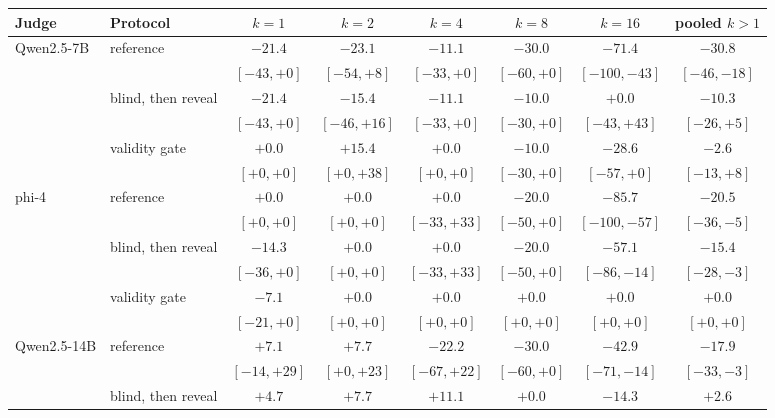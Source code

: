 \begin{tabular}{llcccccc}
\toprule
Judge & Protocol & $k{=}1$ & $k{=}2$ & $k{=}4$ & $k{=}8$ & $k{=}16$ & pooled $k{>}1$ \\
\midrule
Qwen2.5-7B & reference & $-21.4$ & $-23.1$ & $-11.1$ & $-30.0$ & $-71.4$ & $-30.8$ \\
 & & {\scriptsize$[-43,+0]$} & {\scriptsize$[-54,+8]$} & {\scriptsize$[-33,+0]$} & {\scriptsize$[-60,+0]$} & {\scriptsize$[-100,-43]$} & {\scriptsize$[-46,-18]$} \\
 & blind, then reveal & $-21.4$ & $-15.4$ & $-11.1$ & $-10.0$ & $+0.0$ & $-10.3$ \\
 & & {\scriptsize$[-43,+0]$} & {\scriptsize$[-46,+16]$} & {\scriptsize$[-33,+0]$} & {\scriptsize$[-30,+0]$} & {\scriptsize$[-43,+43]$} & {\scriptsize$[-26,+5]$} \\
 & validity gate & $+0.0$ & $+15.4$ & $+0.0$ & $-10.0$ & $-28.6$ & $-2.6$ \\
 & & {\scriptsize$[+0,+0]$} & {\scriptsize$[+0,+38]$} & {\scriptsize$[+0,+0]$} & {\scriptsize$[-30,+0]$} & {\scriptsize$[-57,+0]$} & {\scriptsize$[-13,+8]$} \\
\addlinespace
phi-4 & reference & $+0.0$ & $+0.0$ & $+0.0$ & $-20.0$ & $-85.7$ & $-20.5$ \\
 & & {\scriptsize$[+0,+0]$} & {\scriptsize$[+0,+0]$} & {\scriptsize$[-33,+33]$} & {\scriptsize$[-50,+0]$} & {\scriptsize$[-100,-57]$} & {\scriptsize$[-36,-5]$} \\
 & blind, then reveal & $-14.3$ & $+0.0$ & $+0.0$ & $-20.0$ & $-57.1$ & $-15.4$ \\
 & & {\scriptsize$[-36,+0]$} & {\scriptsize$[+0,+0]$} & {\scriptsize$[-33,+33]$} & {\scriptsize$[-50,+0]$} & {\scriptsize$[-86,-14]$} & {\scriptsize$[-28,-3]$} \\
 & validity gate & $-7.1$ & $+0.0$ & $+0.0$ & $+0.0$ & $+0.0$ & $+0.0$ \\
 & & {\scriptsize$[-21,+0]$} & {\scriptsize$[+0,+0]$} & {\scriptsize$[+0,+0]$} & {\scriptsize$[+0,+0]$} & {\scriptsize$[+0,+0]$} & {\scriptsize$[+0,+0]$} \\
\addlinespace
Qwen2.5-14B & reference & $+7.1$ & $+7.7$ & $-22.2$ & $-30.0$ & $-42.9$ & $-17.9$ \\
 & & {\scriptsize$[-14,+29]$} & {\scriptsize$[+0,+23]$} & {\scriptsize$[-67,+22]$} & {\scriptsize$[-60,+0]$} & {\scriptsize$[-71,-14]$} & {\scriptsize$[-33,-3]$} \\
 & blind, then reveal & $+4.7$ & $+7.7$ & $+11.1$ & $+0.0$ & $-14.3$ & $+2.6$ \\

\end{tabular}
